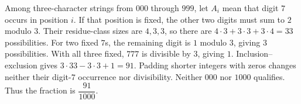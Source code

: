 Among three-character strings from $000$ through $999$, let $A_i$ mean that digit $7$ occurs in position $i$. If that position is fixed, the other two digits must sum to $2$ modulo $3$. Their residue-class sizes are $4,3,3$, so there are $4\cdot 3+3\cdot 3+3\cdot 4=33$ possibilities. For two fixed $7$s, the remaining digit is $1$ modulo $3$, giving $3$ possibilities. With all three fixed, $777$ is divisible by $3$, giving $1$. Inclusion--exclusion gives $3\cdot 33-3\cdot 3+1=91$. Padding shorter integers with zeros changes neither their digit-$7$ occurrence nor divisibility. Neither $000$ nor $1000$ qualifies. Thus the fraction is $\boxed{\dfrac{91}{1000}}$.

